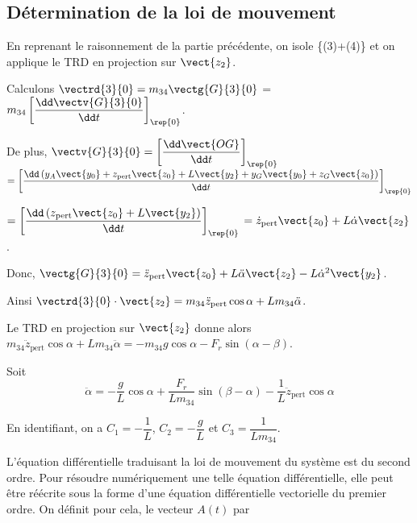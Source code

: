 \subsection{Détermination de la loi de mouvement}
\ifprof
\begin{corrige}
En reprenant le raisonnement de la partie précédente, on isole \{(3)+(4)\} et on applique le TRD en projection sur $\vect{z_2}$.

Calculons $\vectrd{3}{0}=m_{34}\vectg{G}{3}{0}$ =$m_{34}\left[\dfrac{\dd \vectv{G}{3}{0}}{\dd t}\right]_{\rep{0}}$.

De plus, $\vectv{G}{3}{0}=\left[\dfrac{\dd \vect{OG}}{\dd t}\right]_{\rep{0}}$
$=\left[\dfrac{\dd \left(y_A\vect{y_0}+z_{\text{pert}}\vect{z_0}+L\vect{y_2}+y_G\vect{y_0}+z_{G}\vect{z_0}\right)}{\dd t}\right]_{\rep{0}}$

$=\left[\dfrac{\dd \left(z_{\text{pert}}\vect{z_0}+L\vect{y_2}\right)}{\dd t}\right]_{\rep{0}}$
$=\dot{z}_{\text{pert}}\vect{z_0}+L\dot{\alpha}\vect{z_2}$.

Donc, $\vectg{G}{3}{0} = \ddot{z}_{\text{pert}}\vect{z_0}+L\ddot{\alpha}\vect{z_2}-L\dot{\alpha}^2\vect{y_2}$.

Ainsi $\vectrd{3}{0}\cdot\vect{z_2} = m_{34}\ddot{z}_{\text{pert}}\cos\alpha+Lm_{34}\ddot{\alpha}$.

Le TRD en projection sur $\vect{z_2}$ donne alors 
$m_{34}\ddot{z}_{\text{pert}}\cos\alpha+Lm_{34}\ddot{\alpha} 
= -m_{34} g\cos\alpha -F_r\sin\left(\alpha-\beta \right)$.

Soit 
$$\boxed{\ddot{\alpha} 
= - \dfrac{g}{L}\cos\alpha +\dfrac{F_r}{Lm_{34}}\sin\left(\beta - \alpha \right)-\dfrac{1}{L}\ddot{z}_{\text{pert}}
\cos\alpha}$$

En identifiant, on a $C_1=-\dfrac{1}{L}$, $C_2 = -\dfrac{g}{L}$ et $C_3 = \dfrac{1}{Lm_{34}}$.
\end{corrige}
\else
\fi

\ifprof
\else
L'équation différentielle traduisant la loi de mouvement du système est du second ordre. Pour résoudre numériquement une telle équation différentielle, elle peut être réécrite sous la forme d'une équation différentielle vectorielle du premier ordre. On définit pour cela, le vecteur $A(t)$ par

